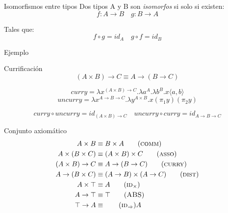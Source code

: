 \begin{frame}{Isomorfismos entre tipos}
	Dos tipos A y B son \textit{isomorfos} si solo si existen:
	\[ f: A \rightarrow B \quad g: B \rightarrow A \]
	
	\pause
	
	Tales que:
	\[ f \circ g = id_A \quad g \circ f = id_B \]
\end{frame}

\begin{frame}{Ejemplo}
	\begin{exampleblock}{Currificación}
		\[ (A \times B) \rightarrow C \equiv A \rightarrow (B \rightarrow C) \]
		
		\pause
		\[ curry = \lambda x^{(A \times B) \rightarrow C}. \lambda a^A . \lambda b^B . x\langle a,b \rangle \]
		\[ uncurry = \lambda x^{A \rightarrow B \rightarrow C}. \lambda y^{A \times B} . x(\pi_1 y)(\pi_2 y) \]
		
		\pause
		\[ curry \circ uncurry = id_{(A \times B) \rightarrow C} \quad
		uncurry \circ curry = id_{A \rightarrow B \rightarrow C} \]
	\end{exampleblock}
\end{frame}

\begin{frame}{Conjunto axiomático}
	\begin{align*}
		A \times B &\equiv B \times A \tag{\textsc{comm}} \\
		A \times (B \times C) &\equiv (A \times B) \times C \tag{\textsc{asso}} \\
		(A \times B) \rightarrow C &\equiv A \rightarrow (B \rightarrow C) \tag{\textsc{curry}} \\
		A \rightarrow (B \times C) &\equiv (A \rightarrow B) \times (A \rightarrow C) \tag{\textsc{dist}} \\
		A \times \top &\equiv A \tag{\textsc{id$_\times$}} \\
		A \rightarrow \top &\equiv \top \tag{\textsc{ABS}} \\
		\top \rightarrow A &\equiv \tag{\textsc{id$_\Rightarrow$}} A
	\end{align*}
\end{frame}

